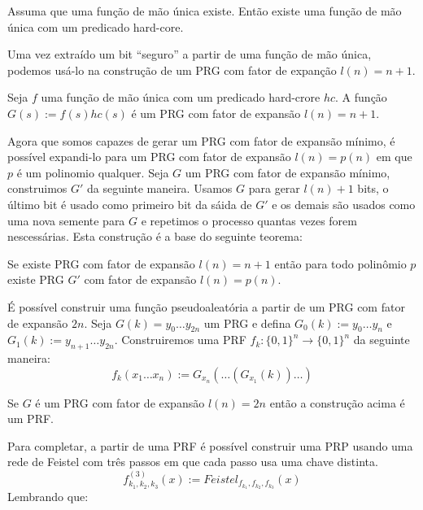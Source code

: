 \begin{theorem}
  Assuma que uma função de mão única existe. Então existe uma função de mão única com um predicado hard-core.
\end{theorem}

Uma vez extraído um bit ``seguro'' a partir de uma função de mão única, podemos usá-lo na construção de um PRG com fator de expanção $l(n) = n + 1$.

\begin{theorem}
  Seja $f$ uma função de mão única com um predicado hard-crore $hc$.
A função $G(s) := f(s)hc(s)$ é um PRG com fator de expansão $l(n) = n+1$.
\end{theorem}

Agora que somos capazes de gerar um PRG com fator de expansão mínimo, é possível expandi-lo para um PRG com fator de expansão $l(n) = p(n)$ em que $p$ é um polinomio qualquer.
Seja $G$ um PRG com fator de expansão mínimo, construimos $G'$ da seguinte maneira.
Usamos $G$ para gerar $l(n)+1$ bits, o último bit é usado como primeiro bit da sáida de $G'$ e os demais são usados como uma nova semente para $G$ e repetimos o processo quantas vezes forem nescessárias.
Esta construção é a base do seguinte teorema:


\begin{theorem}
  Se existe PRG com fator de expansão $l(n) = n + 1$ então para todo polinômio $p$ existe PRG $G'$ com fator de expansão $l(n) = p(n)$.
\end{theorem}

  
É possível construir uma função pseudoaleatória a partir de um PRG com fator de expansão $2n$.
Seja $G(k) = y_0 \dots y_{2n}$ um PRG e defina $G_0(k) := y_0 \dots y_n$ e $G_1(k) := y_{n+1} \dots y_{2n}$.
Construiremos uma PRF $f_k: \{0,1\}^n \to \{0,1\}^n$ da seguinte maneira:
\begin{displaymath}
  f_k(x_1 \dots x_n) := G_{x_n}(\dots (G_{x_1}(k))\dots)
\end{displaymath}

\begin{theorem}
  Se $G$ é um PRG com fator de expansão $l(n) = 2n$ então a construção acima é um PRF.  
\end{theorem}


Para completar, a partir de uma PRF é possível construir uma PRP usando uma rede de Feistel com três passos em que cada passo usa uma chave distinta.
\begin{displaymath}
  f_{k_1,k_2,k_3}^{(3)}(x) := Feistel_{f_{k_1},f_{k_2},f_{k_3}}(x)
\end{displaymath}
Lembrando que:

